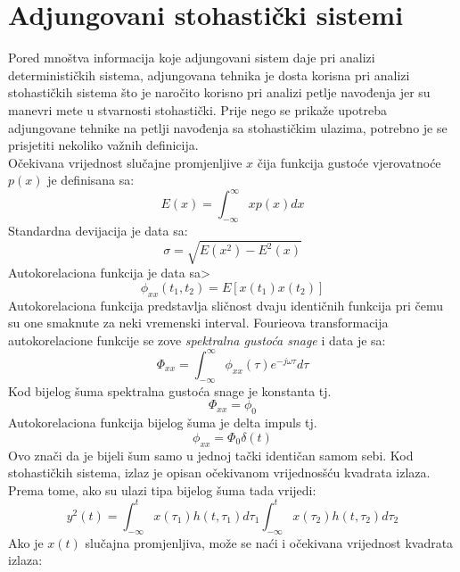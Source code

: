 \section{Adjungovani stohastički sistemi}
Pored mnoštva informacija koje adjungovani sistem daje pri analizi determinističkih 
sistema, adjungovana tehnika je dosta korisna pri analizi stohastičkih sistema što je 
naročito korisno pri analizi petlje navođenja jer su manevri mete u stvarnosti stohastički. 
Prije nego se prikaže upotreba adjungovane tehnike na petlji navođenja sa stohastičkim 
ulazima, potrebno je se prisjetiti nekoliko važnih definicija.\\
Očekivana vrijednost slučajne promjenljive $x$ čija funkcija gustoće vjerovatnoće $p(x)$ je definisana sa:
\begin{equation}
    E(x)=\int_{-\infty}^{\infty}xp(x)dx
\end{equation}
Standardna devijacija je data sa:
\begin{equation}
    \sigma = \sqrt{E(x^2)-E^2(x)}
\end{equation}
Autokorelaciona funkcija je data sa>
\begin{equation}
    \phi_{xx}(t_1,t_2)=E[x(t_1)x(t_2)]
\end{equation}
Autokorelaciona funkcija predstavlja sličnost dvaju identičnih funkcija 
pri čemu su one smaknute za neki vremenski interval.
Fourieova transformacija autokorelacione funkcije se zove \textit{spektralna 
gustoća snage} i data je sa:
\begin{equation}
    \Phi_{xx}=\int_{-\infty}^{\infty}\phi_{xx}(\tau)e^{-j\omega\tau}d\tau
\end{equation}
Kod bijelog šuma spektralna gustoća snage je konstanta tj.
\begin{equation}
    \Phi_{xx}=\phi_{0}
\end{equation}
Autokorelaciona funkcija bijelog šuma je delta impuls tj. 
\begin{equation}
    \phi_{xx}=\Phi_{0}\delta(t)
\end{equation}
Ovo znači da je bijeli šum samo u jednoj tački identičan samom sebi. 
Kod stohastičkih sistema, izlaz je opisan očekivanom vrijednosšću kvadrata izlaza. 
Prema tome, ako su ulazi tipa bijelog šuma tada vrijedi:
\begin{equation}
    y^2(t)=\int_{-\infty}^tx(\tau_1)h(t,\tau_1)d\tau_1\int_{-\infty}^tx(\tau_2)h(t,\tau_2)d\tau_2
\end{equation}
Ako je $x(t)$ slučajna promjenljiva, može se naći i očekivana vrijednost kvadrata izlaza:
